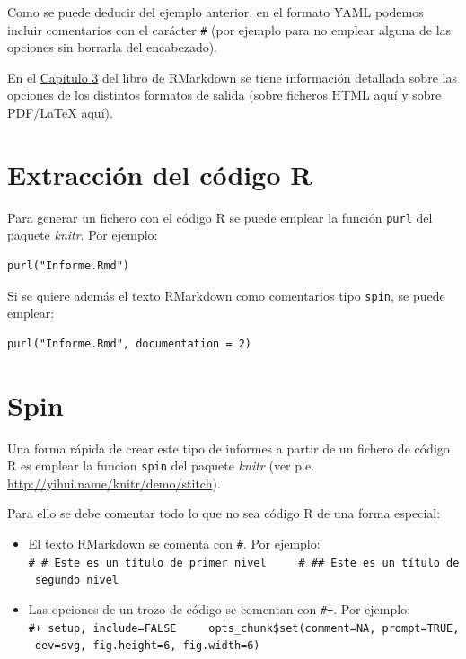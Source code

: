 \documentclass[
]{book}
\providecommand{\tightlist}{%
  \setlength{\itemsep}{0pt}\setlength{\parskip}{0pt}}
\theoremstyle{break}
\theoremstyle{nonumberplain}
\begin{document}
Como se puede deducir del ejemplo anterior, en el formato YAML podemos incluir comentarios con el carácter \texttt{\#}
(por ejemplo para no emplear alguna de las opciones sin borrarla del encabezado).

En el \href{https://bookdown.org/yihui/rmarkdown/documents.html}{Capítulo 3} del libro de RMarkdown
se tiene información detallada sobre las opciones de los distintos formatos de salida
(sobre ficheros HTML \href{https://bookdown.org/yihui/rmarkdown/html-document.html}{aquí}
y sobre PDF/LaTeX \href{https://bookdown.org/yihui/rmarkdown/pdf-document.html}{aquí}).

\hypertarget{extracciuxf3n-del-cuxf3digo-r}{%
\section{Extracción del código R}\label{extracciuxf3n-del-cuxf3digo-r}}

Para generar un fichero con el código R se puede emplear la función \texttt{purl} del paquete \emph{knitr}. Por ejemplo:

\begin{verbatim}
purl("Informe.Rmd")
\end{verbatim}

Si se quiere además el texto RMarkdown como comentarios tipo \texttt{spin}, se puede emplear:

\begin{verbatim}
purl("Informe.Rmd", documentation = 2)
\end{verbatim}

\hypertarget{spin}{%
\section{Spin}\label{spin}}

Una forma rápida de crear este tipo de informes a partir de un fichero de código R es emplear la funcion
\texttt{spin} del paquete \emph{knitr} (ver p.e. \url{http://yihui.name/knitr/demo/stitch}).

Para ello se debe comentar todo lo que no sea código R de una forma especial:

\begin{itemize}
\tightlist
\item
  El texto RMarkdown se comenta con \texttt{\#\textquotesingle{}}. Por ejemplo:
  \texttt{\#\textquotesingle{}\ \#\ Este\ es\ un\ título\ de\ primer\ nivel\ \ \ \ \ \#\textquotesingle{}\ \#\#\ Este\ es\ un\ título\ de\ segundo\ nivel}
\item
  Las opciones de un trozo de código se comentan con \texttt{\#+}. Por ejemplo:
  \texttt{\#+\ setup,\ include=FALSE\ \ \ \ \ opts\_chunk\$set(comment=NA,\ prompt=TRUE,\ dev=\textquotesingle{}svg\textquotesingle{},\ fig.height=6,\ fig.width=6)}
\end{itemize}
\end{document}
